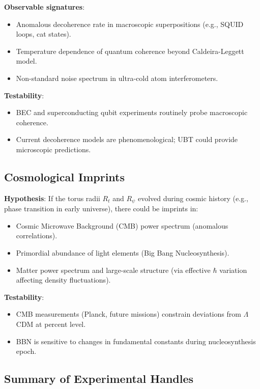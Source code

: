 \documentclass[12pt]{article}
\begin{document}
\textbf{Observable signatures}:
\begin{itemize}
\item Anomalous decoherence rate in macroscopic superpositions (e.g., SQUID loops, cat states).
\item Temperature dependence of quantum coherence beyond Caldeira-Leggett model.
\item Non-standard noise spectrum in ultra-cold atom interferometers.
\end{itemize}

\textbf{Testability}:
\begin{itemize}
\item BEC and superconducting qubit experiments routinely probe macroscopic coherence.
\item Current decoherence models are phenomenological; UBT could provide microscopic predictions.
\end{itemize}

\subsection{Cosmological Imprints}

\textbf{Hypothesis}: If the torus radii $R_t$ and $R_\psi$ evolved during cosmic history (e.g., phase transition in early universe), there could be imprints in:
\begin{itemize}
\item Cosmic Microwave Background (CMB) power spectrum (anomalous correlations).
\item Primordial abundance of light elements (Big Bang Nucleosynthesis).
\item Matter power spectrum and large-scale structure (via effective $\hbar$ variation affecting density fluctuations).
\end{itemize}

\textbf{Testability}:
\begin{itemize}
\item CMB measurements (Planck, future missions) constrain deviations from $\Lambda$CDM at percent level.
\item BBN is sensitive to changes in fundamental constants during nucleosynthesis epoch.
\end{itemize}

\subsection{Summary of Experimental Handles}
\end{document}
